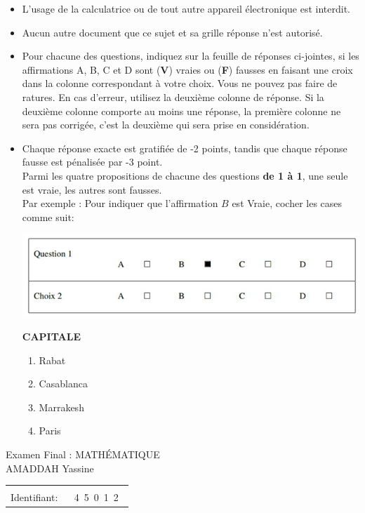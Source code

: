 \documentclass{book}%
\begin{document}
\begin{itemize}%
\item%
L'usage de la calculatrice ou de tout autre appareil électronique est interdit.%
\item%
Aucun autre document que ce sujet et sa grille réponse n'est autorisé.%
\item%
Pour chacune des questions, indiquez sur la feuille de réponses ci-jointes, si les affirmations A, B, C et D sont (\textbf{V}) vraies ou (\textbf{F}) fausses en faisant une croix dans la colonne correspondant à votre choix. Vous ne pouvez pas faire de ratures. En cas d'erreur, utilisez la deuxième colonne de réponse. Si la deuxième colonne comporte au moins une réponse, la première colonne ne sera pas corrigée, c'est la deuxième qui sera prise en considération.%
\item%
Chaque réponse exacte est gratifiée de -2 points, tandis que chaque réponse fausse est pénalisée par -3 point. \\ 	Parmi les quatre propositions de chacune des questions \textbf{de 1 à 1}, une seule est vraie, les autres sont fausses. \\ 	Par exemple : Pour indiquer que l'affirmation $B$ est Vraie, cocher les cases comme suit:  \\ \begin{center}	\includegraphics[scale=0.8]{reponses.png} \end{center}%
\thispagestyle{empty}%
\begin{exercise}%
\textbf{CAPITALE }%
\begin{enumerate}[label=\textbf{\Alph*. }]%
\item%
Rabat%
\item%
Casablanca%
\item%
Marrakesh%
\item%
Paris%
\end{enumerate}%
\end{exercise}%
\end{itemize}%
\newpage%
\thispagestyle{empty}%
Examen Final : MATHÉMATIQUE $\qquad \qquad \qquad \qquad \qquad \qquad \qquad \qquad$ AMADDAH Yassine%
\begin{flushright}%
\begin{tabular}{|l|}%
\hline%
 \\%
\thispagestyle{empty}%
Identifiant: $\quad$ {\Large 4~5~0~1~2~}%
 \\%
\hline%
\end{tabular}%
\end{flushright}%
\end{document}
